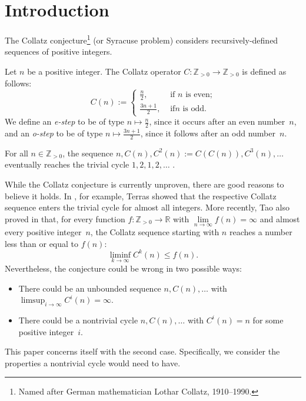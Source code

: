 \documentclass[12pt,reqno]{article}
\begin{document}
\section{Introduction}

The Collatz conjecture\footnote{Named after German mathematician Lothar
Collatz, 1910--1990.} (or Syracuse problem) considers recursively-defined
sequences of positive integers.

\begin{definition}
Let $n$ be a positive integer. The Collatz operator $C: \mathbb{Z}_{>0}
\rightarrow \mathbb{Z}_{>0}$ is defined as follows: \[C(n):=\begin{cases}
\frac{n}{2}, & \text{ if $n$ is even;}\\ \frac{3n+1}{2}, & \text{ if
$n$ is odd.}\end{cases}\] We define an \textit{e-step} to be of type
$n\mapsto \tfrac{n}{2}$, since it occurs after an even number~$n$, and
an \textit{o-step} to be of type $n\mapsto \tfrac{3n+1}{2}$, since it
follows after an odd number~$n$.  \end{definition}

\begin{conjecture}[Collatz]
For all $n\in\mathbb{Z}_{>0}$, the sequence $n, C(n), C^2(n):=C(C(n)), C^3(n), \ldots$ eventually reaches the trivial cycle $1, 2, 1, 2, \ldots$ .
\end{conjecture}

\begin{remark}
While the Collatz conjecture is
currently unproven, there are good reasons to believe it holds. In \cite{RT}, for example, Terras showed that the respective Collatz sequence enters the trivial cycle for almost all integers. More recently, Tao also proved in \cite{Tao} that, for every function $f:\mathbb{Z}_{>0}\rightarrow \mathbb{R}$ with $\lim\limits_{n\rightarrow\infty} f(n)= \infty$ and almost every positive integer~$n$, the Collatz sequence starting with $n$ reaches a number less than or equal to $f(n)$:
\[\liminf_{k\rightarrow \infty} C^k(n)\leq f(n).\]
Nevertheless, the conjecture could be wrong in two possible ways:
\begin{itemize}
\item There could be an unbounded sequence $n, C(n), \ldots$ with $\limsup_{i\rightarrow \infty} C^i(n)=\infty$.
\item There could be a nontrivial cycle $n, C(n), \ldots$ with $C^i(n)=n$ for some positive integer~$i$.
\end{itemize}
This paper concerns itself with the second case. 
Specifically, we consider the properties a nontrivial cycle would need to have.
\end{remark}
\end{document}
